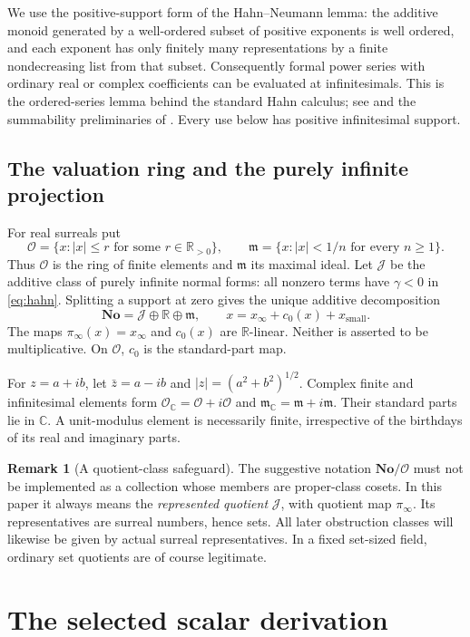 \documentclass[11pt,a4paper]{article}
\theoremstyle{definition}
\newtheorem{remark}[theorem]{Remark}
\newcommand{\No}{\mathbf{No}}
\newcommand{\R}{\mathbb R}
\newcommand{\C}{\mathbb C}
\newcommand{\OO}{\mathcal O}
\newcommand{\mm}{\mathfrak m}
\newcommand{\JJ}{\mathcal J}
\newcommand{\pinf}{\pi_{\infty}}
\numberwithin{equation}{section}
\begin{document}
We use the positive-support form of the Hahn--Neumann lemma: the additive
monoid generated by a well-ordered subset of positive exponents is well
ordered, and each exponent has only finitely many representations by a
finite nondecreasing list from that subset. Consequently formal power
series with ordinary real or complex coefficients can be evaluated at
infinitesimals. This is the ordered-series lemma behind the standard
Hahn calculus; see \cite{Neumann} and the summability preliminaries of
\cite{BM}. Every use below has positive infinitesimal support.

\subsection{The valuation ring and the purely infinite projection}
For real surreals put
\[
 \OO=\{x: |x|\le r\text{ for some }r\in\R_{>0}\},\qquad
 \mm=\{x: |x|<1/n\text{ for every }n\ge1\}.
\]
Thus $\OO$ is the ring of finite elements and $\mm$ its maximal ideal.
Let $\JJ$ be the additive class of purely infinite normal forms: all
nonzero terms have $\gamma<0$ in \eqref{eq:hahn}. Splitting a support at
zero gives the unique additive decomposition
\begin{equation}\label{eq:threeparts}
 \No=\JJ\oplus\R\oplus\mm,
 \qquad x=x_\infty+c_0(x)+x_\mathrm{small}.
\end{equation}
The maps $\pinf(x)=x_\infty$ and $c_0(x)$ are $\R$-linear. Neither is
asserted to be multiplicative. On $\OO$, $c_0$ is the standard-part map.

For $z=a+ib$, let $\bar z=a-ib$ and
$|z|=(a^2+b^2)^{1/2}$. Complex finite and infinitesimal elements form
$\OO_\C=\OO+i\OO$ and $\mm_\C=\mm+i\mm$. Their standard parts lie in
$\C$. A unit-modulus element is necessarily finite, irrespective of the
birthdays of its real and imaginary parts.

\begin{remark}[A quotient-class safeguard]\label{rem:quotient}
The suggestive notation $\No/\OO$ must not be implemented as a collection
whose members are proper-class cosets. In this paper it always means the
\emph{represented quotient} $\JJ$, with quotient map $\pinf$. Its
representatives are surreal numbers, hence sets. All later obstruction
classes will likewise be given by actual surreal representatives. In a
fixed set-sized field, ordinary set quotients are of course legitimate.
\end{remark}

\section{The selected scalar derivation}\label{sec:derivation}
\end{document}
